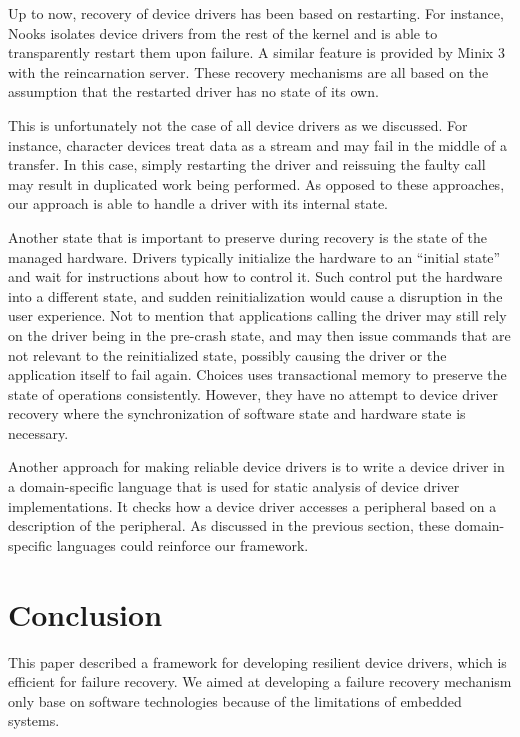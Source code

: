 \documentclass{report}
\begin{document}
Up to now, recovery of device drivers has been based on restarting. For instance, Nooks\cite{Swift2003}\cite{Swift2006} isolates device drivers from the rest of the kernel and is able to transparently restart them upon failure. A similar feature is provided by Minix 3 with the reincarnation server\cite{Herder2007}. These recovery mechanisms are all based on the assumption that the restarted driver has no state of its own.

This is unfortunately not the case of all device drivers as we discussed. For instance, character devices treat data as a stream and may fail in the middle of a transfer. In this case, simply restarting the driver and reissuing the faulty call may result in duplicated work being performed.  As opposed to these approaches, our approach is able to handle a driver with its internal state.

Another state that is important to preserve during recovery is the state of the managed hardware. Drivers typically initialize the hardware to an ``initial state'' and wait for instructions about how to control it. Such control put the hardware into a different state, and sudden reinitialization would cause a disruption in the user experience. Not to mention that applications calling the driver may still rely on the driver being in the pre-crash state, and may then issue commands that are not relevant to the reinitialized state, possibly causing the driver or the application itself to fail again.  Choices\cite{David2007} uses transactional memory to preserve the state of operations consistently.  However, they have no attempt to device driver recovery where the synchronization of software state and hardware state is necessary.

Another approach for making reliable device drivers is to write a device driver in a domain-specific language that is used for static analysis of device driver implementations\cite{merillon00devil}\cite{michael06solving}.  It checks how a device driver accesses a peripheral based on a description of the peripheral.  As discussed in the previous section, these domain-specific languages could reinforce our framework.

\section{Conclusion}
\label{s:sum}

This paper described a framework for developing resilient device drivers, which is efficient for failure recovery.  We aimed at developing a failure recovery mechanism only base on software technologies because of the limitations of embedded systems.
\end{document}
